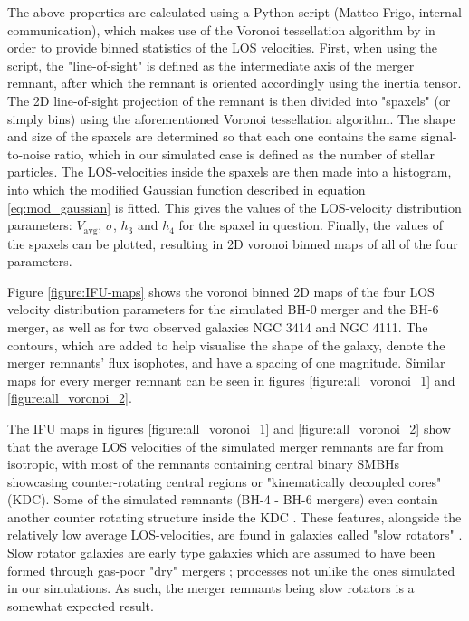\documentclass[english, oneside]{HYgradu}
\begin{document}
The above properties are calculated using a Python-script (Matteo Frigo, internal communication), which makes use of the Voronoi tessellation algorithm by \citep{Cappellari2003} in order to provide binned statistics of the LOS velocities. First, when using the script, the "line-of-sight" is defined as the intermediate axis of the merger remnant, after which the remnant is oriented accordingly using the inertia tensor. The 2D line-of-sight projection of the remnant is then divided into "spaxels" (or simply bins) using the aforementioned Voronoi tessellation algorithm. The shape and size of the spaxels are determined so that each one contains the same signal-to-noise ratio, which in our simulated case is defined as the number of stellar particles. The LOS-velocities inside the spaxels are then made into a histogram, into which the modified Gaussian function described in equation \ref{eq:mod_gaussian} is fitted. This gives the values of the LOS-velocity distribution parameters: $V_\mathrm{avg}$, $\sigma$, $h_3$ and $h_4$ for the spaxel in question. Finally, the values of the spaxels can be plotted, resulting in 2D voronoi binned maps of all of the four parameters.

Figure \ref{figure:IFU-maps} shows the voronoi binned 2D maps of the four LOS velocity distribution parameters for the simulated BH-0 merger and the BH-6 merger, as well as for two observed galaxies NGC 3414 and NGC 4111. The contours, which are added to help visualise the shape of the galaxy, denote the merger remnants' flux isophotes, and have a spacing of one magnitude. Similar maps for every merger remnant can be seen in figures \ref{figure:all_voronoi_1} and \ref{figure:all_voronoi_2}.

The IFU maps in figures \ref{figure:all_voronoi_1} and \ref{figure:all_voronoi_2} show that the average LOS velocities of the simulated merger remnants are far from isotropic, with most of the remnants containing central binary SMBHs showcasing counter-rotating central regions or "kinematically decoupled cores" (KDC). Some of the simulated remnants (BH-4 - BH-6 mergers) even contain another counter rotating structure inside the KDC \citep{Rantala2019}. These features, alongside the relatively low average LOS-velocities, are found in galaxies called "slow rotators" \citep{Emsellem2007}. Slow rotator galaxies are early type galaxies which are assumed to have been formed through gas-poor "dry" mergers \citep{Emsellem2007, Cappellari2007}; processes not unlike the ones simulated in our simulations. As such, the merger remnants being slow rotators is a somewhat expected result.
\end{document}
